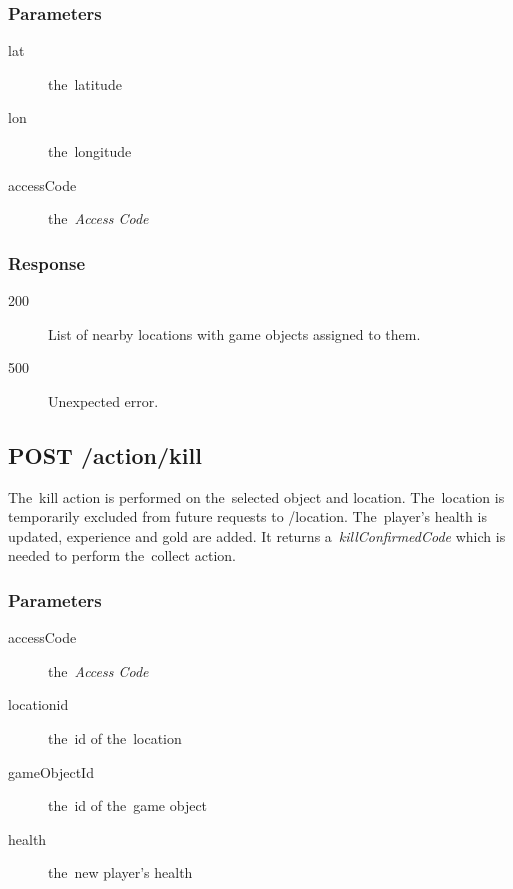 \subsubsection*{Parameters}

\begin{description}

	\item[lat] the~latitude

	\item[lon] the~longitude

	\item[accessCode] the~\textit{Access Code}

\end{description}

\subsubsection*{Response}

\begin{description}

	\item[200] List of nearby locations with game objects assigned to them.

	\item[500] Unexpected error.

\end{description}

\subsection{POST /action/kill}

The~kill action is performed on the~selected object and location. The~location is temporarily excluded from future requests to /location. The~player's health is updated, experience and gold are added. It returns a~\textit{killConfirmedCode} which is needed to perform the~collect action.

\subsubsection*{Parameters}

\begin{description}

	\item[accessCode] the~\textit{Access Code}

	\item[locationid] the~id of the~location

	\item[gameObjectId] the~id of the~game object

	\item[health] the~new player's health

\end{description}

